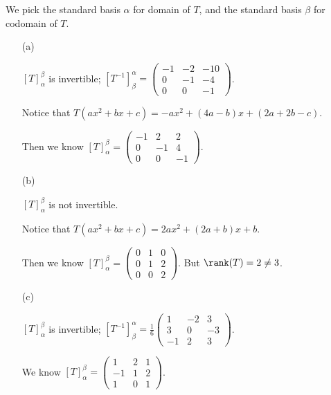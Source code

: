 \begin{Exercise}
We pick the standard basis $\alpha$ for domain of $T$, and the standard basis $\beta$ for codomain of $T$.
\begin{enumerate}[(a)]
\item[(a)]
\begin{answer}
$[T]_{\alpha}^{\beta}$ is invertible; $[T^{-1}]_{\beta}^{\alpha} = \begin{pmatrix}
-1 & -2 & -10 \\
0 & -1 & -4 \\
0 & 0 & -1
\end{pmatrix}$.
\end{answer}
\begin{solution}
Notice that $T(a x^2 +b x+c) = -a x^2 + (4a-b)x+(2a+2b-c)$. 

Then we know $[T]_{\alpha}^{\beta}=\begin{pmatrix}
-1 & 2 & 2 \\
0 & -1 & 4 \\
0 & 0 & -1
\end{pmatrix}$.
\end{solution}

\item[(b)]
\begin{answer}
$[T]_{\alpha}^{\beta}$ is not invertible.
\end{answer}
\begin{solution}
Notice that $T(a x^2 +b x+c) = 2a x^2 + (2a+b)x+b$. 

Then we know $[T]_{\alpha}^{\beta}=\begin{pmatrix}
0 & 1 & 0 \\
0 & 1 & 2 \\
0 & 0 & 2
\end{pmatrix}$. But $\rank(T) = 2 \neq 3$.
\end{solution}

\item[(c)]
\begin{answer}
$[T]_{\alpha}^{\beta}$ is invertible; $[T^{-1}]_{\beta}^{\alpha} = \frac{1}{6}\begin{pmatrix}
1 & -2 & 3 \\
3 & 0 & -3 \\
-1 & 2 & 3
\end{pmatrix}$.
\end{answer}
\begin{solution}
We know $[T]_{\alpha}^{\beta}=\begin{pmatrix}
1 & 2 & 1 \\
-1 & 1 & 2 \\
1 & 0 & 1
\end{pmatrix}$.
\end{solution}
\end{enumerate}
\end{Exercise}